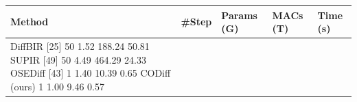 \begin{tabular}{lllll}
\toprule
Method & \#Step & Params (G) & MACs (T) & Time (s) \\
\midrule
DiffBIR [25] 50 1.52 188.24 50.81 SUPIR [49] 50 4.49 464.29 24.33 OSEDiff [43] 1 1.40 10.39 0.65 CODiff (ours) 1 1.00 9.46 0.57 &  &  &  &  \\
\bottomrule
\end{tabular}
